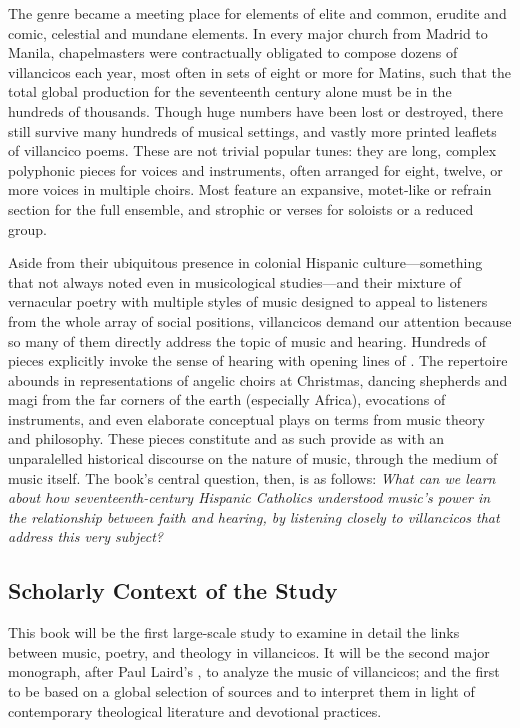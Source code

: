\documentclass[tt]{vcbook-proposal}
\begin{document}
The genre became a meeting place for elements of elite and common, erudite and comic, celestial and mundane elements.
In every major church from Madrid to Manila, chapelmasters were contractually obligated to compose dozens of villancicos each year, most often in sets of eight or more for Matins, such that the total global production for the seventeenth century alone must be in the hundreds of thousands.
Though huge numbers have been lost or destroyed, there still survive many hundreds of musical settings, and vastly more printed leaflets of villancico poems. 
These are not trivial popular tunes: they are long, complex polyphonic pieces for voices and instruments, often arranged for eight, twelve, or more voices in multiple choirs.
Most feature an expansive, motet-like  or refrain section for the full ensemble, and strophic  or verses for soloists or a reduced group.

Aside from their ubiquitous presence in colonial Hispanic culture---something that not always noted even in musicological studies---and their mixture of vernacular poetry with multiple styles of music designed to appeal to listeners from the whole array of social positions, villancicos demand our attention because so many of them directly address the topic of music and hearing.
Hundreds of pieces explicitly invoke the sense of hearing with opening lines of   .
The repertoire abounds in representations of angelic choirs at Christmas, dancing shepherds and magi from the far corners of the earth (especially Africa), evocations of instruments, and even elaborate conceptual plays on terms from music theory and philosophy.
These pieces constitute  and as such provide as with an unparalelled historical discourse on the nature of music, through the medium of music itself.
The book's central question, then, is as follows: 
\emph{What can we learn about how seventeenth-century Hispanic Catholics understood music's power in the relationship between faith and hearing, by listening closely to villancicos that address this very subject?}

\subsection{Scholarly Context of the Study}

This book will be the first large-scale study to examine in detail the links between music, poetry, and theology in villancicos.
It will be the second major monograph, after Paul Laird's , to analyze the music of villancicos; and the first to be based on a global selection of sources and to interpret them in light of contemporary theological literature and devotional practices.
\end{document}
